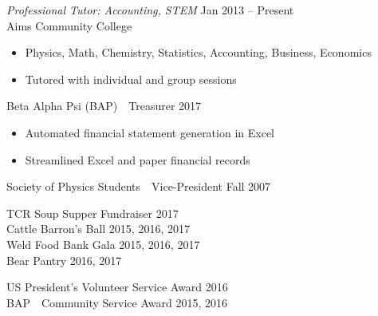 \documentclass[10pt]{article}
\begin{document}
\begin{description}[leftmargin=!,labelwidth=3cm,align=left,itemsep=-9px,partopsep=-5px]
    \textit{Professional Tutor: Accounting, STEM} \hfill Jan 2013 -- Present\\
    Aims Community College
    \begin{itemize}[rightmargin=2cm,noitemsep]%
        \item Physics, Math, Chemistry, Statistics, Accounting, Business, Economics
        \item Tutored with individual and group sessions
    \end{itemize}
\item[\rule{196mm}{0.5pt}]
%
%
\item[Leadership]
    Beta Alpha Psi (BAP)\ \ Treasurer \hfill 2017
    \begin{itemize}[rightmargin=2cm,noitemsep]%
        \item Automated financial statement generation in Excel
        \item Streamlined Excel and paper financial records
    \end{itemize}
    Society of Physics Students\ \ Vice-President \hfill Fall 2007
\item[\rule{196mm}{0.5pt}]

%
%
\item[Volunteering]
	TCR Soup Supper Fundraiser \hfill 2017\\
	Cattle Barron's Ball \hfill 2015, 2016, 2017\\
	Weld Food Bank Gala  \hfill 2015, 2016, 2017\\
	Bear Pantry	         \hfill       2016, 2017
\item[\rule{196mm}{0.5pt}]

%
%
\item[Awards]
    US President's Volunteer Service Award \hfill 2016\\
    BAP\ \ Community Service Award \hfill 2015, 2016
\item[\rule{196mm}{0.5pt}]


\end{description}
\end{document}
